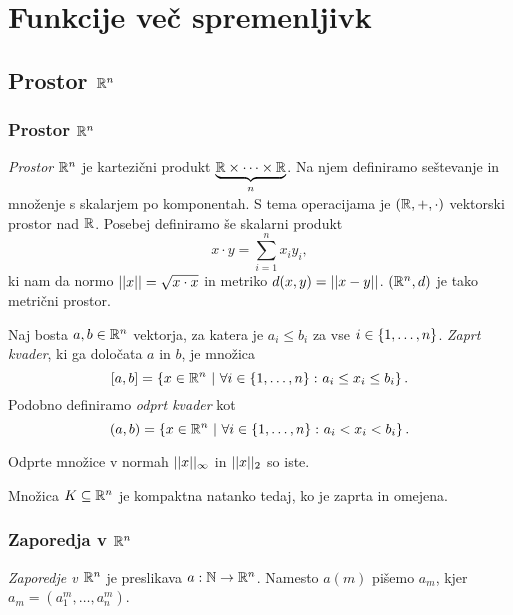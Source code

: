 \section{Funkcije več spremenljivk}
\subsection{Prostor $\mathbb{R}^n$}
\subsubsection{Prostor $\mathbb{R}^n$}
\begin{definicija}
    \emph{Prostor $\mathbb{R}^n$} je kartezični produkt
    $\underbrace{\mathbb{R} \times \dots \times \mathbb{R}}_n$. Na njem definiramo
    seštevanje in množenje s skalarjem po komponentah. S tema
    operacijama je $(\mathbb{R},+,\cdot)$ vektorski prostor nad $\mathbb{R}$. Posebej
    definiramo še skalarni produkt
    \[
    x \cdot y = \sum_{i=1}^n x_iy_i,
    \]
    ki nam da normo $||x||=\sqrt{x \cdot x}$ in metriko
    $d(x,y) = ||x-y||$. $(\mathbb{R}^n,d)$ je tako metrični prostor.
    \end{definicija}

\begin{definicija}
    Naj bosta $a,b \in \mathbb{R}^n$ vektorja, za katera je $a_i \leq b_i$ za
    vse $i \in \left\{1,\dots,n\right\}$. \emph{Zaprt kvader}, ki
    ga določata $a$ in $b$, je množica
    \[
    [a,b] = \left\{x\in\mathbb{R}^n \ | \ \forall i \in \left\{1,\dots,n\right\} \colon
    a_i \leq x_i \leq b_i\right\}.
    \]
    Podobno definiramo \emph{odprt kvader} kot
    \[
    (a,b) = \left\{x\in\mathbb{R}^n \ | \ \forall i \in \left\{1,\dots,n\right\} \colon
    a_i < x_i < b_i\right\}.
    \]
    \end{definicija}
    
    \begin{opomba}
    Odprte množice v normah $||x||_\infty$ in $||x||_2$ so iste.
    \end{opomba}
    
    \begin{izrek}
    Množica $K\subseteq\mathbb{R}^n$ je kompaktna natanko tedaj, ko je zaprta
    in omejena.
    \end{izrek}

\subsubsection{Zaporedja v $\mathbb{R}^n$}
\begin{definicija}
    \emph{Zaporedje v $\mathbb{R}^n$} je preslikava $a: \mathbb{N} \to \mathbb{R}^n$. Namesto $a(m)$ pišemo $a_m$, kjer $a_m = (a_1^m, \ldots, a_n^m)$.
\end{definicija}

